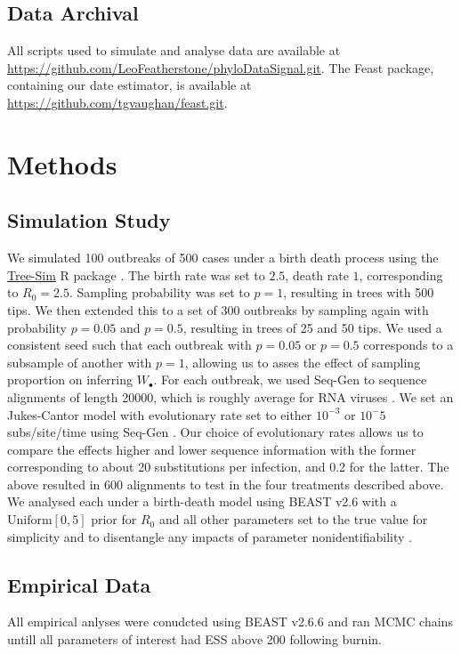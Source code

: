 \documentclass{article}
\begin{document}
\subsection*{Data Archival}
All scripts used to simulate and analyse data are available at \url{https://github.com/LeoFeatherstone/phyloDataSignal.git}. The Feast package, containing our date estimator, is available at \url{https://github.com/tgvaughan/feast.git}.
\section*{Methods}
\subsection*{Simulation Study}
We simulated 100 outbreaks of 500 cases under a birth death process using the \url{Tree-Sim} R package \citep{TreeSim}. The birth rate was set to $2.5$, death rate $1$, corresponding to $R_{0} = 2.5$. Sampling probability was set to $p=1$, resulting in trees with 500 tips. We then extended this to a set of 300 outbreaks by sampling again with probability $p=0.05$ and $p = 0.5$, resulting in trees of 25 and 50 tips. We used a consistent seed such that each outbreak with $p=0.05$ or $p=0.5$ corresponds to a subsample of another with $p=1$, allowing us to asses the effect of sampling proportion on inferring $W_{\bullet}$. For each outbreak, we used Seq-Gen to sequence alignments of length 20000, which is roughly average for RNA viruses \citep{sanjuan2010viral,rambaut_seq-gen_1997}. We set an Jukes-Cantor model with evolutionary rate set to either $10^{-3}$ or $10^-{5}$ subs/site/time using Seq-Gen \cite{rambaut_seq-gen_1997}.  Our choice of evolutionary rates allows us to compare the effects higher and lower sequence information with the former corresponding to about 20 substitutions per infection, and 0.2 for the latter. 
The above resulted in 600 alignments to test in the four treatments described above. We analysed each under a birth-death model using BEAST v2.6 \citet{bouckaert_beast_2019} with a $\textrm{Uniform}[0,5]$ prior for $R_0$ and all other parameters set to the true value for simplicity and to disentangle any impacts of parameter nonidentifiability \citep{louca2021fundamental}.

\subsection*{Empirical Data}
All empirical anlyses were conudcted using BEAST v2.6.6 \citep{bouckaert_beast_2019} and ran MCMC chains untill all parameters of interest had ESS above 200 following burnin.
\end{document}
